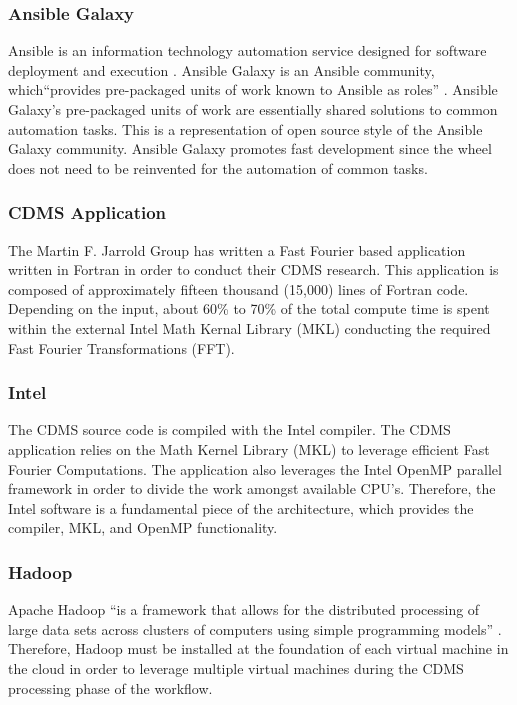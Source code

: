\documentclass[9pt,twocolumn,twoside]{../../styles/osajnl}
\begin{document}
\subsubsection{Ansible Galaxy} 
Ansible is an information technology automation service designed for
software deployment and execution \cite{ansible}.  Ansible Galaxy is
an Ansible community, which``provides pre-packaged units of work known
to Ansible as roles'' \cite{ansible-galaxy}. Ansible Galaxy's
pre-packaged units of work are essentially shared solutions to common
automation tasks. This is a representation of open source style of the
Ansible Galaxy community. Ansible Galaxy promotes fast development
since the wheel does not need to be reinvented for the automation of
common tasks.

\subsubsection{CDMS Application} 
The Martin F. Jarrold Group has written a Fast Fourier based
application written in Fortran in order to conduct their CDMS
research. This application is composed of approximately fifteen
thousand (15,000) lines of Fortran code. Depending on the input, about
60\% to 70\% of the total compute time is spent within the external
Intel Math Kernal Library (MKL) conducting the required Fast Fourier
Transformations (FFT).

\subsubsection{Intel} 
The CDMS source code is compiled with the Intel compiler. The CDMS
application relies on the Math Kernel Library (MKL) to leverage
efficient Fast Fourier Computations. The application also leverages
the Intel OpenMP parallel framework in order to divide the work
amongst available CPU's. Therefore, the Intel software is a
fundamental piece of the architecture, which provides the compiler,
MKL, and OpenMP functionality.

\subsubsection{Hadoop} 
Apache Hadoop ``is a framework that allows for the distributed
processing of large data sets across clusters of computers using
simple programming models'' \cite{hadoop}. Therefore, Hadoop must be
installed at the foundation of each virtual machine in the cloud in
order to leverage multiple virtual machines during the CDMS processing
phase of the workflow.
\end{document}
